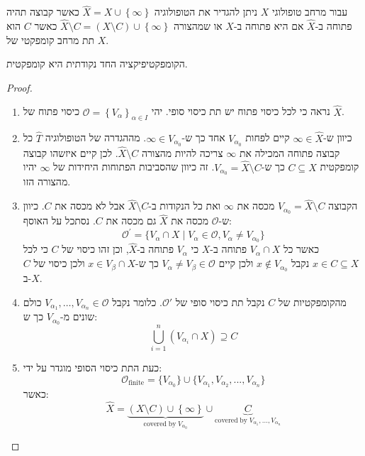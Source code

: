 \documentclass{tstextbook}
\begin{document}
\begin{definition}
עבור מרחב טופולוגי \(X\) ניתן להגדיר את הטופולוגיה \(\hat{X}=X\cup \left\{  \infty  \right\}\) כאשר קבוצה תהיה פתוחה ב-\(\hat{X}\) אם היא פתוחה ב-\(X\) או שמהצורה \(\hat{X} \setminus C=\left( X\setminus C \right)\cup \left\{  \infty  \right\}\) כאשר \(C\) הוא תת מרחב קומפקטי של \(X\).

\end{definition}
\begin{proposition}
הקומפקטיפיקציה החד נקודתית היא קומפקטית.

\end{proposition}
\begin{proof}
  \begin{enumerate}
    \item נראה כי לכל כיסוי פתוח יש תת כיסוי סופי. יהי \(\mathcal{O}=\left\{  V_{\alpha}  \right\}_{\alpha \in I}\) כיסוי פתוח של \(\hat{X}\).  


    \item כיוון ש-\(\infty \in \hat{X}\) קיים לפחות \(V_{\alpha_{0}}\) אחד כך ש-\(\infty \in V_{\alpha_{0}}\). מההגדרה של הטופולוגיה \(\hat{T}\) כל קבוצה פתוחה המכילה את \(\infty\) צריכה להיות מהצורה \(\hat{X} \setminus C\). לכן קיים איזשהו קבוצה קומפקטית \(C\subseteq X\) כך ש-\(V_{\alpha_{0}}=\hat{X} \setminus C\). זה כיוון שהסביבות הפתוחות היחידות של \(\infty\) יהיו מהצורה הזו. 


    \item הקבוצה \(V_{\alpha_{0}}=\hat{X} \setminus C\) מכסה את \(\infty\) ואת כל הנקודות ב-\(\hat{X} \setminus C\) אבל לא מכסה את \(C\). כיוון ש-\(\mathcal{O}\) מכסה את \(\hat{X}\) גם מכסה את \(C\). נסתכל על האוסף: 
$${\mathcal{O}}^{\prime}=\{V_{\alpha}\cap X\mid V_{\alpha}\in{\mathcal{O}},V_{\alpha}\neq V_{\alpha_{0}}\}$$
כאשר כל \(V_{\alpha}\cap X\) פתוחה ב-\(X\) כי \(V_{\alpha}\) פתוחה ב-\(\hat{X}\), וכן זהו כיסוי של \(C\) כי לכל \(x \in C\subseteq X\) נקבל \(x \not \in V_{\alpha_{0}}\) ולכן קיים \(V_{\alpha }\neq V_{\beta}\in \mathcal{O}\) כך ש-\(x \in V_{\beta}\cap X\) ולכן כיסוי של \(C\) ב-\(X\).


    \item מהקומפקטיות של \(C\) נקבל תת כיסוי סופי של \(\mathcal{O'}\). כלומר נקבל \(V_{\alpha_{1}},\dots,V_{\alpha_{n}}\in \mathcal{O}\) כולם שונים מ-\(V_{\alpha_{0}}\) כך ש: 
$$\bigcup_{i=1}^{n}\left( V_{\alpha_{i}}\cap X \right)\supseteq C$$


    \item כעת התת כיסוי הסופי מוגדר על ידי: 
$${\mathcal{O}}_{\mathrm{finite}}=\{V_{\alpha_{0}}\}\cup\{V_{\alpha_{1}},V_{\alpha_{2}},...,V_{\alpha_{n}}\}$$
כאשר:
$$\hat{X}=\underbrace{\left(X\setminus C\right)\cup\left\{\infty\right\}}_{\mathrm{covered\;by\;}V_{\alpha_{0}}}\cup\underbrace{C}_{\mathrm{covered\;by\;}V_{\alpha_{1}},\ldots,V_{\alpha_{n}}}$$


  \end{enumerate}
\end{proof}
\end{document}
